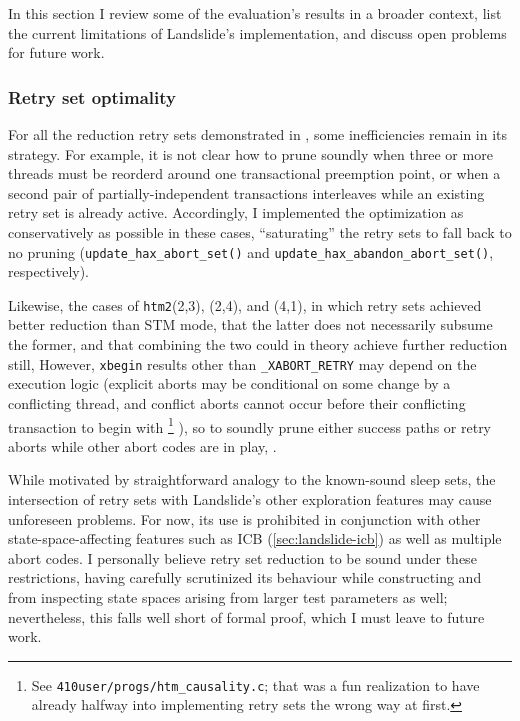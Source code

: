 In this section I review some of the evaluation's results in a broader context,
list the current limitations of Landslide's implementation,
and discuss open problems for future work.

\subsubsection{Retry set optimality}

For all the reduction retry sets demonstrated in ,
some inefficiencies remain in its strategy.
For example, it is not clear how to prune soundly
when three or more threads must be reorderd around one transactional preemption point,
or when a second pair of partially-independent transactions interleaves while an existing retry set is already active.
Accordingly, I implemented the optimization as conservatively as possible in these cases,
``saturating'' the retry sets to fall back to no pruning
({\tt update\_hax\_abort\_set()} and
{\tt update\_hax\_abandon\_abort\_set()}, respectively).

Likewise, the cases of {\tt htm2}(2,3), (2,4), and (4,1),
in which retry sets achieved better reduction than STM mode,
 that the latter does not necessarily subsume the former,
and that combining the two could in theory achieve further reduction still,
However, {\tt xbegin} results other than {\tt \_XABORT\_RETRY}
may depend on the execution logic
(explicit aborts may be conditional on some change by a conflicting thread,
and conflict aborts cannot occur before their conflicting transaction to begin with%
\footnote{See {\tt 410user/progs/htm\_causality.c}; that was a fun realization to have
already halfway into implementing retry sets the wrong way at first.}%
),
so 
to soundly prune either success paths or retry aborts
while other abort codes are in play,
.

While
motivated by straightforward analogy to the known-sound sleep sets,
the intersection of retry sets with Landslide's other exploration features may cause unforeseen problems.
For now, its use is prohibited in conjunction with other state-space-affecting features
such as ICB (\cref{sec:landslide-icb})
as well as multiple abort codes.
I personally believe retry set reduction to be sound under these restrictions,
having carefully scrutinized its behaviour
while constructing 
and from inspecting state spaces arising from larger test parameters as well; %
nevertheless, this falls well short of formal proof, which I must leave to future work.

